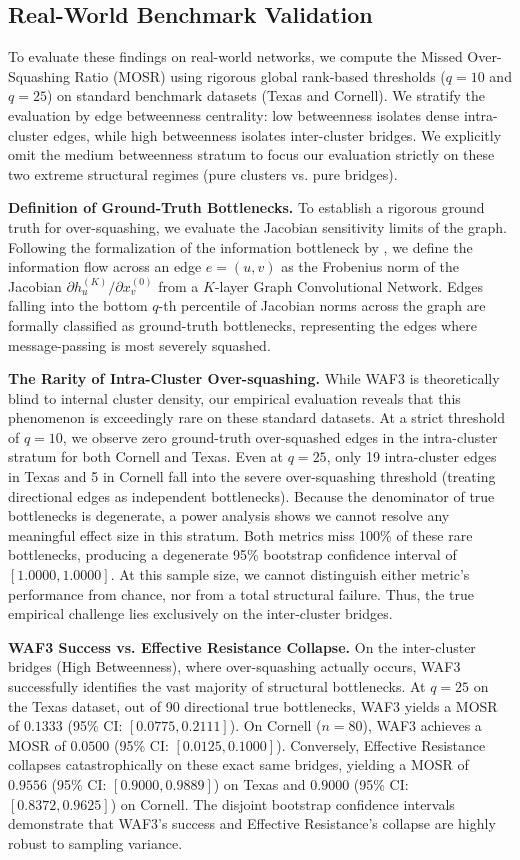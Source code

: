 \documentclass[10pt]{article} %
\begin{document}
\subsection{Real-World Benchmark Validation}
To evaluate these findings on real-world networks, we compute the Missed Over-Squashing Ratio (MOSR) using rigorous global rank-based thresholds ($q=10$ and $q=25$) on standard benchmark datasets (Texas and Cornell). We stratify the evaluation by edge betweenness centrality: low betweenness isolates dense intra-cluster edges, while high betweenness isolates inter-cluster bridges. We explicitly omit the medium betweenness stratum to focus our evaluation strictly on these two extreme structural regimes (pure clusters vs. pure bridges).

\textbf{Definition of Ground-Truth Bottlenecks.}
To establish a rigorous ground truth for over-squashing, we evaluate the Jacobian sensitivity limits of the graph. Following the formalization of the information bottleneck by \citet{Alon2021}, we define the information flow across an edge $e=(u,v)$ as the Frobenius norm of the Jacobian $\partial h_u^{(K)} / \partial x_v^{(0)}$ from a $K$-layer Graph Convolutional Network. Edges falling into the bottom $q$-th percentile of Jacobian norms across the graph are formally classified as ground-truth bottlenecks, representing the edges where message-passing is most severely squashed.

\textbf{The Rarity of Intra-Cluster Over-squashing.}
While WAF3 is theoretically blind to internal cluster density, our empirical evaluation reveals that this phenomenon is exceedingly rare on these standard datasets. At a strict threshold of $q=10$, we observe zero ground-truth over-squashed edges in the intra-cluster stratum for both Cornell and Texas. Even at $q=25$, only 19 intra-cluster edges in Texas and 5 in Cornell fall into the severe over-squashing threshold (treating directional edges as independent bottlenecks). Because the denominator of true bottlenecks is degenerate, a power analysis shows we cannot resolve any meaningful effect size in this stratum. Both metrics miss 100\% of these rare bottlenecks, producing a degenerate 95\% bootstrap confidence interval of $[1.0000, 1.0000]$. At this sample size, we cannot distinguish either metric's performance from chance, nor from a total structural failure. Thus, the true empirical challenge lies exclusively on the inter-cluster bridges.

\textbf{WAF3 Success vs. Effective Resistance Collapse.}
On the inter-cluster bridges (High Betweenness), where over-squashing actually occurs, WAF3 successfully identifies the vast majority of structural bottlenecks. At $q=25$ on the Texas dataset, out of 90 directional true bottlenecks, WAF3 yields a MOSR of $0.1333$ (95\% CI: $[0.0775, 0.2111]$). On Cornell ($n=80$), WAF3 achieves a MOSR of $0.0500$ (95\% CI: $[0.0125, 0.1000]$). Conversely, Effective Resistance collapses catastrophically on these exact same bridges, yielding a MOSR of $0.9556$ (95\% CI: $[0.9000, 0.9889]$) on Texas and $0.9000$ (95\% CI: $[0.8372, 0.9625]$) on Cornell. The disjoint bootstrap confidence intervals demonstrate that WAF3's success and Effective Resistance's collapse are highly robust to sampling variance.
\end{document}
